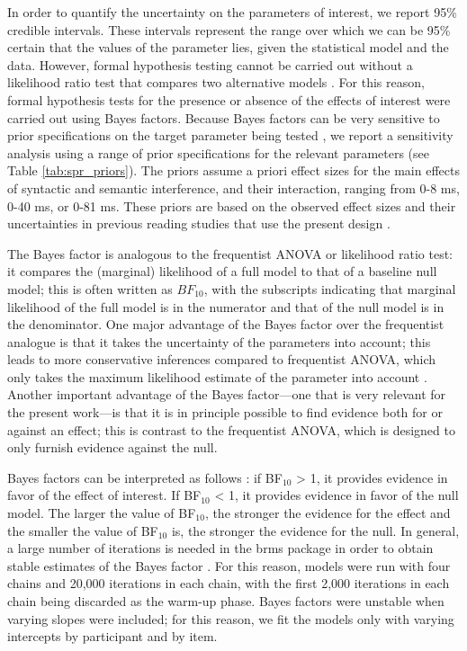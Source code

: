 \documentclass[a4paper, man, floatsintext]{apa7}
\begin{document}
In order to quantify the uncertainty on the parameters of interest, we report 95\% credible intervals.  
These intervals represent the range over which we can be 95\% certain that the values of the parameter lies, given the statistical model and the data. However, formal hypothesis testing cannot be carried out without a likelihood ratio test that compares two alternative models \parencite{schad_etal_2022_BF,Royall}. For this reason, formal hypothesis tests for the presence or absence of the effects of interest were carried out using Bayes factors. Because Bayes factors can be very sensitive to prior specifications on the target parameter being tested \parencite{schad_etal_2022_BF}, 
we report a sensitivity analysis using a range of prior specifications for the relevant parameters (see Table \ref{tab:spr_priors}). The priors assume a priori effect sizes for the main effects of syntactic and semantic interference, and their interaction, ranging from 0-8 ms, 0-40 ms, or 0-81 ms.  These priors are based on the observed effect sizes and their uncertainties in previous reading studies that use the present design \parencite{vandyke07,mertzen}.

The Bayes factor is analogous to the frequentist ANOVA or likelihood ratio test: it compares the (marginal) likelihood of a full model to that of a baseline null model; this is often written as $BF_{10}$, with the subscripts indicating that marginal likelihood of the full model is in the numerator and that of the null model is in the denominator. One major advantage of the Bayes factor over the frequentist analogue is that it takes the uncertainty of the parameters into account; this leads to more conservative inferences compared to frequentist ANOVA, which only takes the maximum likelihood estimate of the parameter into account \parencite[see][for detailed discussion]{schad_etal_2022_BF}. Another important advantage of the Bayes factor---one that is very relevant for the present work---is that it is in principle possible to find evidence both for or against an effect; this is contrast to the frequentist ANOVA, which is designed to only furnish evidence against the null. 

Bayes factors can be interpreted as follows \parencite[e.g., ][]{lee2014bayesian}: if BF$_{10}$ > 1, it provides evidence in favor of the effect of interest. If BF$_{10}$ < 1, it provides evidence in favor of the null model. The larger the value of BF$_{10}$, the stronger the evidence for the effect and the smaller the value of BF$_{10}$ is, the stronger the evidence for the null. 
In general, a large number of iterations is needed in the brms package in order to obtain stable estimates of the Bayes factor  \citep{schad_etal_2022_BF}.
For this reason, models were run with four chains and 20,000 iterations in each chain, with the first 2,000 iterations in each chain being discarded as the warm-up phase.  Bayes factors were unstable when varying slopes were included; for this reason, we fit the models only with varying intercepts by participant and by item.
\end{document}
